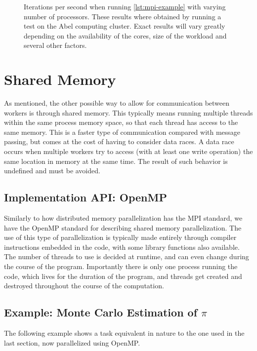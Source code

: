 \documentclass[Thesis.tex]{subfiles}
\begin{document}
\begin{figure}[h]
  \centering
    \resizebox{0.7\linewidth}{!}{%
        
    }
  \caption{Iterations per second when running \cref{lst:mpi-example} with
    varying number of processors. These results where obtained by running a test
    on the Abel computing cluster. Exact results will vary greatly depending on
    the availability of the cores, size of the workload and several other factors.}
  \label{fig:mpi-example}
\end{figure}


\section{Shared Memory}

As mentioned, the other possible way to allow for communication between workers
is through shared memory. This typically means running multiple threads within
the same process memory space, so that each thread has access to the same
memory. This is a faster type of communication compared with message passing,
but comes at the cost of having to consider data races. A data race occurs when
multiple workers try to access (with at least one write operation) the same
location in memory at the same time. The result of such behavior is undefined
and must be avoided.

\subsection{Implementation API: OpenMP}

Similarly to how distributed memory parallelization has the MPI standard, we
have the OpenMP standard for describing shared memory parallelization. The use
of this type of parallelization is typically made entirely through compiler
instructions embedded in the code, with some library functions also available.
The number of threads to use is decided at runtime, and can even change during
the course of the program. Importantly there is only one process running the
code, which lives for the duration of the program, and threads get
created and destroyed throughout the course of the computation.

\subsection{Example: Monte Carlo Estimation of $\pi$}
The following example shows a task equivalent in nature to
the one used in the last section, now parallelized using OpenMP.
\end{document}
